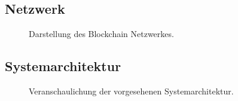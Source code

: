 \documentclass[parskip=full,11pt,twoside]{scrartcl}
\begin{document}
\subsection{Netzwerk}
\begin{figure}[H]
	\caption{\label{fig:network}
		Darstellung des Blockchain Netzwerkes.
	}
\end{figure}

\subsection{Systemarchitektur}
\begin{figure}[H]
	\caption{\label{fig:sysArch}
		Veranschaulichung der vorgesehenen Systemarchitektur.
	}
\end{figure}
\end{document}
